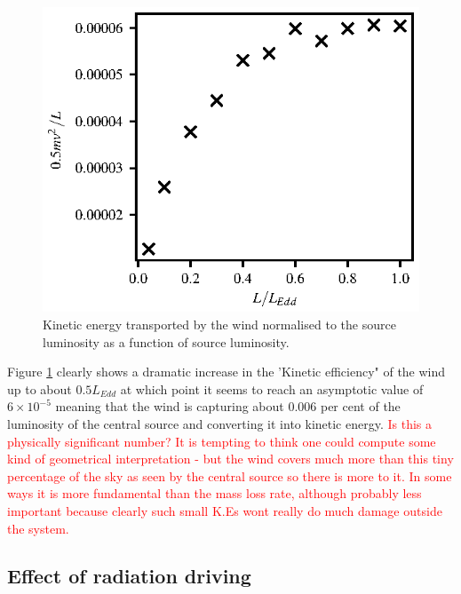 \documentclass[a4paper,fleqn,usenatbib]{mnras}
\begin{document}
\begin{figure}
\includegraphics[width=\columnwidth]{figures/lum_vs_ke.eps}
\caption{Kinetic energy transported by the wind normalised to the source
luminosity as a function of source luminosity.}
\label{figure:ke_vs_lum}
\end{figure}

Figure \ref{figure:ke_vs_lum} clearly shows a dramatic increase in the 'Kinetic
efficiency" of the wind up to about $0.5L_{Edd}$ at which point it seems to
reach an asymptotic value of $6\times10^{-5}$ meaning that the wind is 
capturing about 0.006 per cent of the luminosity of the central source and converting
it into kinetic energy.
\textcolor{red}{Is this a physically significant number? It is tempting to think one 
could compute some kind of geometrical interpretation - but the wind covers much
more than this tiny percentage of the sky as seen by the central source so there
is more to it. In some ways it is more fundamental than the mass loss rate, although
probably less important because clearly such small K.Es wont really do much damage
outside the system.}

\subsection{Effect of radiation driving}
\end{document}
